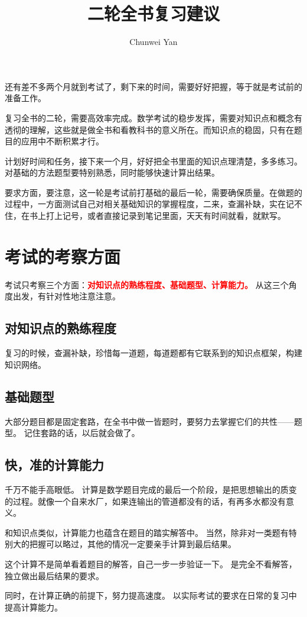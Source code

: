 \documentclass[a4paper]{ctexart}
\author{Chunwei Yan}
\title{二轮全书复习建议}
\begin{document}
    \maketitle
还有差不多两个月就到考试了，剩下来的时间，需要好好把握，等于就是考试前的准备工作。
\par
复习全书的二轮，需要高效率完成。数学考试的稳步发挥，需要对知识点和概念有透彻的理解，这些就是做全书和看教科书的意义所在。而知识点的稳固，只有在题目的应用中不断积累才行。
\par
计划好时间和任务，接下来一个月，好好把全书里面的知识点理清楚，多多练习。 对基础的方法题型要特别熟悉，同时能够快速计算出结果。
\par
要求方面，要注意，这一轮是考试前打基础的最后一轮，需要确保质量。在做题的过程中，一方面测试自己对相关基础知识的掌握程度，二来，查漏补缺，实在记不住，在书上打上记号，或者直接记录到笔记里面，天天有时间就看，就默写。

\section{考试的考察方面}
考试只考察三个方面：{\heiti \textcolor{red}{\textbf{对知识点的熟练程度、基础题型、计算能力。}}}
从这三个角度出发，有针对性地注意注意。 
\subsection{对知识点的熟练程度}
复习的时候，查漏补缺，珍惜每一道题，每道题都有它联系到的知识点框架，构建知识网络。
\subsection{基础题型}
大部分题目都是固定套路，在全书中做一皆题时，要努力去掌握它们的共性——题型。 记住套路的话，以后就会做了。
\subsection{快，准的计算能力}
千万不能手高眼低。 计算是数学题目完成的最后一个阶段，是把思想输出的质变的过程。就像一个自来水厂，如果连输出的管道都没有的话，有再多水都没有意义。
\par
和知识点类似，计算能力也蕴含在题目的踏实解答中。 当然，除非对一类题有特别大的把握可以略过，其他的情况一定要亲手计算到最后结果。
\par
这个计算不是简单看着题目的解答，自己一步一步验证一下。 是完全不看解答，独立做出最后结果的要求。
\par
同时，在计算正确的前提下，努力提高速度。 以实际考试的要求在日常的复习中提高计算能力。
\end{document}
